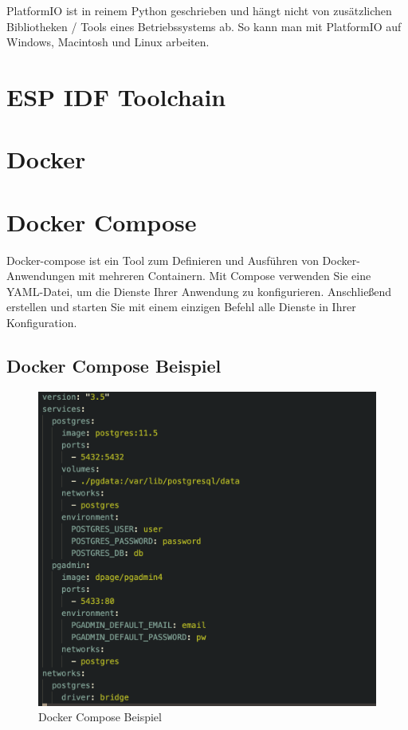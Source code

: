 PlatformIO ist in reinem Python geschrieben und hängt nicht von zusätzlichen Bibliotheken / Tools eines Betriebssystems ab. So kann man mit PlatformIO auf Windows, Macintosh und Linux arbeiten.

\section{ESP IDF Toolchain}\label{sec:platformio}


\section{Docker}\label{sec:docker}


\section{Docker Compose}\label{sec:docker-compose}

Docker-compose ist ein Tool zum Definieren und Ausführen von Docker-Anwendungen mit mehreren Containern. Mit Compose verwenden Sie eine YAML-Datei, um die Dienste Ihrer Anwendung zu konfigurieren. Anschließend erstellen und starten Sie mit einem einzigen Befehl alle Dienste in Ihrer Konfiguration. \cite{docker_compose_description}

\subsection{Docker Compose Beispiel}

\begin{figure}[H]
    \begin{center}
        \includegraphics[scale=0.8]{images/docker_compose_example.png}
        \caption{Docker Compose Beispiel}
    \end{center}
\end{figure}

